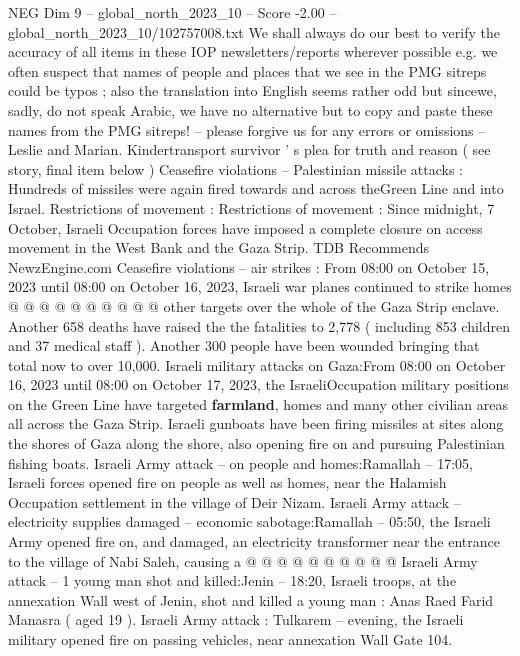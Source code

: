 \begin{textsample}{NEG Dim 9 – global\_north\_2023\_10 – Score -2.00 – global\_north\_2023\_10/102757008.txt}  \label{ex:f9_neg_149}
We shall always do our best to verify the accuracy of all items in these IOP newsletters/reports wherever possible e.g. we often suspect that names of people and places that we see in the PMG sitreps could be typos ; also the translation into English seems rather odd but sincewe, sadly, do not speak Arabic, we have no alternative but to copy and paste these names from the PMG sitreps! -- please forgive us for any errors or omissions -- Leslie and Marian.
Kindertransport survivor ' s plea for truth and reason ( see story, final item below ) Ceasefire violations -- Palestinian missile attacks : Hundreds of missiles were again fired towards and across theGreen Line and into Israel.
Restrictions of movement : Restrictions of movement : Since midnight, 7 October, Israeli Occupation forces have imposed a complete closure on access movement in the West Bank and the Gaza Strip.
TDB Recommends NewzEngine.com Ceasefire violations -- air strikes : From 08:00 on October 15, 2023 until 08:00 on October 16, 2023, Israeli war planes continued to strike homes @ @ @ @ @ @ @ @ @ @ other targets over the whole of the Gaza Strip enclave.
Another 658 deaths have raised the the fatalities to 2,778 ( including 853 children and 37 medical staff ).
Another 300 people have been wounded bringing that total now to over 10,000.
Israeli military attacks on Gaza:From 08:00 on October 16, 2023 until 08:00 on October 17, 2023, the IsraeliOccupation military positions on the Green Line have targeted \textbf{farmland}, homes and many other civilian areas all across the Gaza Strip.
Israeli gunboats have been firing missiles at sites along the shores of Gaza along the shore, also opening fire on and pursuing Palestinian fishing boats.
Israeli Army attack -- on people and homes:Ramallah -- 17:05, Israeli forces opened fire on people as well as homes, near the Halamish Occupation settlement in the village of Deir Nizam.
Israeli Army attack -- electricity supplies damaged -- economic sabotage:Ramallah -- 05:50, the Israeli Army opened fire on, and damaged, an electricity transformer near the entrance to the village of Nabi Saleh, causing a @ @ @ @ @ @ @ @ @ @ Israeli Army attack -- 1 young man shot and killed:Jenin -- 18:20, Israeli troops, at the annexation Wall west of Jenin, shot and killed a young man : Anas Raed Farid Manasra ( aged 19 ).
Israeli Army attack : Tulkarem -- evening, the Israeli military opened fire on passing vehicles, near annexation Wall Gate 104.

\end{textsample}
